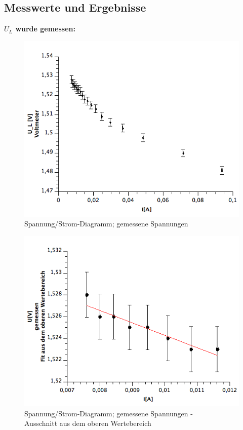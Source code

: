\documentclass[12pt,a4paper]{article}
\begin{document}
\subsection{Messwerte und Ergebnisse}
\textbf{$U_L$ wurde gemessen:}






\begin{figure}[H]
	\centering
	\includegraphics[scale=0.58]{./figure/Batterie_UI_ohneFit.png}
	\caption{Spannung/Strom-Diagramm; gemessene Spannungen}
	\label{fig:Batterie_UI_ohneFit}
\end{figure}



\begin{figure}[H]
	\centering
	\includegraphics[scale=0.58]{./figure/Batterie_UI_mitFit_Abschnitt.png}
	\caption{Spannung/Strom-Diagramm; gemessene Spannungen - \\
	Ausschnitt aus dem oberen Wertebereich}
	\label{fig:Batterie_UI_mitFit_Abschnitt}
\end{figure}
\end{document}
